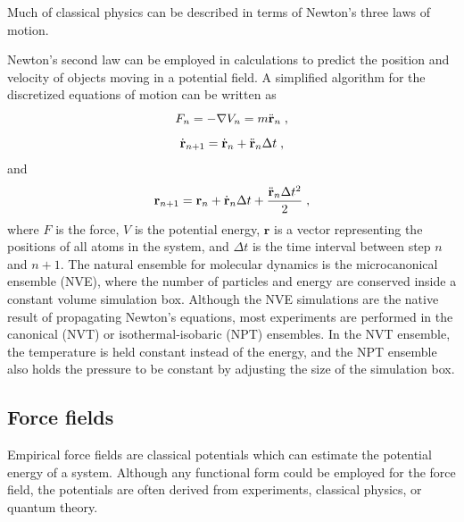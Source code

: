\documentclass[12pt]{report}
\begin{document}
Much of classical physics can be described in terms of Newton's three laws of
motion.
\begin{quote}
\end{quote}
Newton's second law can be employed in calculations to predict the position
and velocity of objects moving in a potential field.
A simplified algorithm for the discretized equations of motion can be written
as
\begin{equation}
 F_{n} = -\nabla V_{n} = m\ddot {\textbf r}_{n} \; ,
\end{equation}
\begin{equation}
 \dot {\textbf r}_{n+1} = \dot {\textbf r}_{n}+\ddot {\textbf r}_{n}
 \Delta t \; ,
\end{equation}
and
\begin{equation}
 {\textbf r}_{n+1} = {\textbf r}_{n}+\dot {\textbf r}_{n}\Delta t
 +\frac{\ddot {\textbf r}_{n}\Delta t^2}{2} \; ,
\end{equation}
where $F$ is the force, $V$ is the potential energy, $\textbf{r}$ is a vector
representing the positions of all atoms in the system, and $\Delta t$ is the
time interval between step $n$ and $n+1$.
The natural ensemble for molecular dynamics is the microcanonical ensemble
(NVE), where the number of particles and energy are conserved inside a
constant volume simulation box.
Although the NVE simulations are the native result of propagating Newton's
equations, most experiments are performed in the canonical (NVT) or
isothermal-isobaric (NPT) ensembles.
In the NVT ensemble, the temperature is held constant instead of the energy,
and the NPT ensemble also holds the pressure to be constant by adjusting the
size of the simulation box.

\subsection{Force fields}

Empirical force fields are classical potentials which can estimate the
potential energy of a system.
Although any functional form could be employed for the force field, the
potentials are often derived from experiments, classical physics, or quantum
theory. \\
\end{document}
